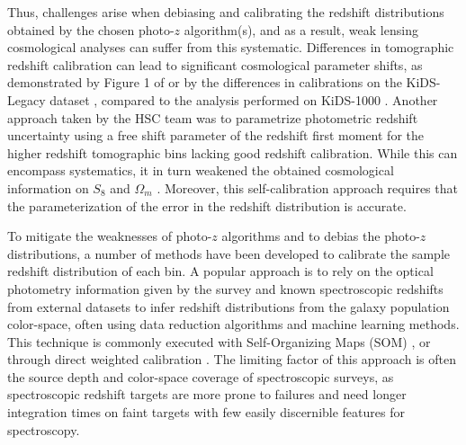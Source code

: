 Thus, challenges arise when debiasing and calibrating the redshift distributions obtained by the chosen photo-$z$ algorithm(s), and as a result, weak lensing cosmological analyses can suffer from this systematic. Differences in tomographic redshift calibration can lead to significant cosmological parameter shifts, as demonstrated by Figure 1 of \cite{HSCClusteringRau2023} or by the differences in calibrations on the KiDS-Legacy dataset \cite{wright2025kidslegacyClusterZ, wright2025kidslegacyCosmoShear}, compared to the analysis performed on KiDS-1000 \cite{Asgari2021KidsCosmoShear}. 
 Another approach taken by the HSC team was to parametrize photometric redshift uncertainty using a free shift parameter of the redshift first moment for the higher redshift tomographic bins lacking good redshift calibration. While this can encompass systematics, it in turn weakened the obtained cosmological information on $S_8$ and $\Omega_m$ \cite{CosmoShearLi2023HSCY3, Dalal2023CosmoShearHSC}. Moreover, this self-calibration approach requires that the parameterization of the error in the redshift distribution is accurate.

To mitigate the weaknesses of photo-$z$ algorithms and to debias the photo-$z$ distributions, a number of methods have been developed to calibrate the sample redshift distribution of each bin. 
A popular approach is to rely on the optical photometry information given by the survey and known spectroscopic redshifts from external datasets to infer redshift distributions from the galaxy population color-space, often using data reduction algorithms and machine learning methods. This technique is commonly executed with Self-Organizing Maps (SOM) \cite{WrightSOMz, SOMPZDES2024, Hildebrandt2021ClusteringRedshiftsSOM, Masters2017C3R2SOM, Buchs2019SOMRedshifts}, or through direct weighted calibration \cite{LimaDIRMethod2008}. 
The limiting factor of this approach is often the source depth and color-space coverage of spectroscopic surveys, as spectroscopic redshift targets are more prone to failures and need longer integration times on faint targets with few easily discernible features for spectroscopy. 

